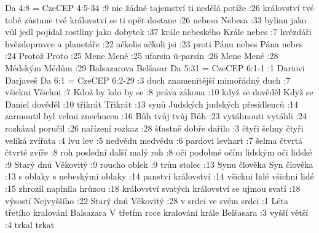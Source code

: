\renum Da 4:8 = CzeCEP 4:5-34 
:9  {nic} {} {} {žádné tajemství ti nedělá potíže} {} {}
:26 {království tvé tobě zůstane} {} {} {tvé království se ti opět dostane} {} {}
:26 {nebesa} {} {} {Nebesa} {} {}
:33 {bylinu jako vůl jedl} {} {} {pojídal rostliny jako dobytek} {} {}
:37 {krále nebeského} {} {} {Krále nebes} {} {}
:7  {hvězdáři} {} {} {hvězdopravce a planetáře} {} {}
:22 {ačkolis} {} {} {ačkoli jsi} {} {}
:23 {proti Pánu nebes} {} {} {Pána nebes} {} {}
:24 {Protož} {} {} {Proto} {} {}
:25 {Mene} {} {} {Mené} {} {}
:25 {ufarsin} {} {} {ú-parsín} {} {}
:26 {Mene} {} {} {Mené} {} {}
:28 {Médským} {} {} {Médům} {} {}
:29 {Balsazarova} {} {} {Belšasar} {} {}
\renum Da 5:31 = CzeCEP 6:1-1
:1  {Dariovi} {} {} {Darjaveš} {} {}
\renum Da 6:1 = CzeCEP 6:2-29
:3  {duch znamenitější} {} {} {mimořádný duch} {} {}
:7  {všickni} {} {} {Všichni} {} {}
:7  {Kdož by} {} {} {kdo by se} {} {}
:8  {práva} {} {} {zákona} {} {}
:10 {když se dověděl} {} {} {Když se Daniel dověděl} {} {}
:10 {třikrát} {} {} {Třikrát} {} {}
:13 {synů Judských} {} {} {judských přesídlenců} {} {}
:14 {zarmoutil} {} {} {byl velmi znechucen} {} {}
:16 {Bůh tvůj} {} {} {tvůj Bůh} {} {}
:23 {vytáhnouti} {} {} {vytáhli} {} {}
:24 {rozkázal} {} {} {poručil} {} {}
:26 {nařízení} {} {} {rozkaz} {} {}
:28 {šťastně} {} {} {dobře dařilo} {} {}
:3  {čtyři šelmy} {} {} {čtyři veliká zvířata} {} {}
:4  {lvu} {} {} {lev} {} {}
:5  {nedvědu} {} {} {medvědu} {} {}
:6  {pardovi} {} {} {levhart} {} {}
:7  {šelma čtvrtá} {} {} {čtvrté zvíře} {} {}
:8  {roh poslední} {} {} {další malý roh} {} {}
:8  {oči podobné očím lidským} {} {} {oči lidské} {} {}
:9  {Starý dnů} {} {} {Věkovitý} {} {}
:9  {roucho} {} {} {oblek} {} {}
:9  {trůn} {} {} {stolec} {} {}
:13 {Synu člověka} {} {} {Syn člověka} {} {}
:13 {s oblaky} {} {} {s nebeskými oblaky} {} {}
:14 {panství} {} {} {království} {} {}
:14 {všickni lidé} {} {} {všichni lidé} {} {}
:15 {zhrozil} {} {} {naplnila hrůzou} {} {}
:18 {království svatých} {} {} {království se ujmou svatí} {} {}
:18 {výsostí} {} {} {Nejvyššího} {} {}
:22 {Starý dnů} {} {} {Věkovitý} {} {}
:28 {v srdci} {} {} {ve svém srdci} {} {}
:1  {Léta třetího kralování Balsazara} {} {} {V třetím roce kralování krále Belšasara} {} {}
:3  {vyšší} {} {} {větší} {} {}
:4  {trkal} {} {} {trkat} {} {}
